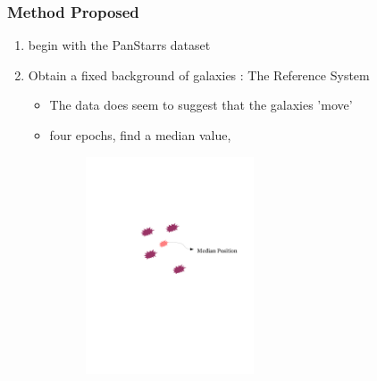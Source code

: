 \documentclass[10pt, compress]{beamer}
\begin{document}
\begin{frame}
\frametitle{Method Proposed}
	\begin{enumerate}
		\item begin with  the PanStarrs dataset
        \item Obtain a fixed background of galaxies : The Reference System
        	\begin{itemize}
				\item The data does seem to suggest that the galaxies 'move'
            	\item four epochs, find a median value, \begin{figure}\includegraphics[width=0.5\textwidth]{2.jpg} \end{figure}
             \end{itemize}
      \end{enumerate}
      
\end{frame}
\end{document}
